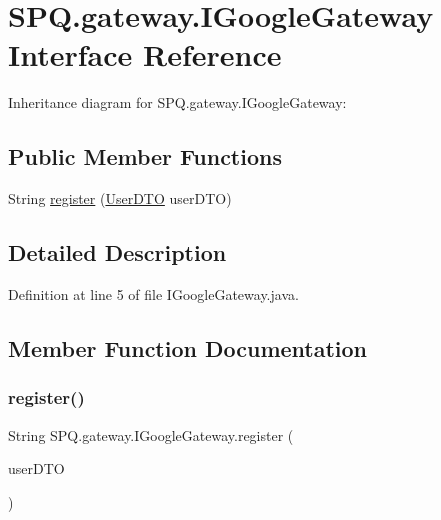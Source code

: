 \hypertarget{interface_s_p_q_1_1gateway_1_1_i_google_gateway}{}\section{S\+P\+Q.\+gateway.\+I\+Google\+Gateway Interface Reference}
\label{interface_s_p_q_1_1gateway_1_1_i_google_gateway}


Inheritance diagram for S\+P\+Q.\+gateway.\+I\+Google\+Gateway\+:
\subsection*{Public Member Functions}
\begin{DoxyCompactItemize}
\item 
String \mbox{\hyperlink{interface_s_p_q_1_1gateway_1_1_i_google_gateway_a35bfcf888bfbf45ab05f33c89348052a}{register}} (\mbox{\hyperlink{class_s_p_q_1_1dto_1_1_user_d_t_o}{User\+D\+TO}} user\+D\+TO)
\end{DoxyCompactItemize}


\subsection{Detailed Description}


Definition at line 5 of file I\+Google\+Gateway.\+java.



\subsection{Member Function Documentation}
\mbox{\label{interface_s_p_q_1_1gateway_1_1_i_google_gateway_a35bfcf888bfbf45ab05f33c89348052a}} 
\subsubsection{\texorpdfstring{register()}{register()}}
{\footnotesize\ttfamily String S\+P\+Q.\+gateway.\+I\+Google\+Gateway.\+register (\begin{DoxyParamCaption}\item[{\mbox{\hyperlink{class_s_p_q_1_1dto_1_1_user_d_t_o}{User\+D\+TO}}}]{user\+D\+TO }\end{DoxyParamCaption})}



